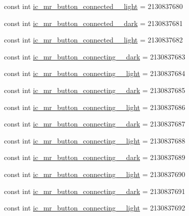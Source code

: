 \begin{CompactItemize}
\item 
const int \hyperlink{class__2doo_1_1_droid_1_1_resource_1_1_drawable_794fc7f06f62074237d996742779e538}{ic\_\-mr\_\-button\_\-connected\_\_\-light} = 2130837680
\item 
const int \hyperlink{class__2doo_1_1_droid_1_1_resource_1_1_drawable_19941e3666c8f84a0aa673fccf871468}{ic\_\-mr\_\-button\_\-connected\_\_\-dark} = 2130837681
\item 
const int \hyperlink{class__2doo_1_1_droid_1_1_resource_1_1_drawable_a088eb060697190f1fe0432b09ccea9f}{ic\_\-mr\_\-button\_\-connected\_\_\-light} = 2130837682
\item 
const int \hyperlink{class__2doo_1_1_droid_1_1_resource_1_1_drawable_872f7ccbfaf38cc5b67f7b20009fd29b}{ic\_\-mr\_\-button\_\-connecting\_\_\-dark} = 2130837683
\item 
const int \hyperlink{class__2doo_1_1_droid_1_1_resource_1_1_drawable_2c5d9049e66ff540fd91e6d675e60fb3}{ic\_\-mr\_\-button\_\-connecting\_\_\-light} = 2130837684
\item 
const int \hyperlink{class__2doo_1_1_droid_1_1_resource_1_1_drawable_e99663a67bfc151d49cc2e3a6290e0a3}{ic\_\-mr\_\-button\_\-connecting\_\_\-dark} = 2130837685
\item 
const int \hyperlink{class__2doo_1_1_droid_1_1_resource_1_1_drawable_2856dcc480a33475adeafd3711bccb3d}{ic\_\-mr\_\-button\_\-connecting\_\_\-light} = 2130837686
\item 
const int \hyperlink{class__2doo_1_1_droid_1_1_resource_1_1_drawable_82913032c4c18b69eb0ebcb71110fd2b}{ic\_\-mr\_\-button\_\-connecting\_\_\-dark} = 2130837687
\item 
const int \hyperlink{class__2doo_1_1_droid_1_1_resource_1_1_drawable_70850b5f147228431d1645d02aa24b9c}{ic\_\-mr\_\-button\_\-connecting\_\_\-light} = 2130837688
\item 
const int \hyperlink{class__2doo_1_1_droid_1_1_resource_1_1_drawable_5e5e4836c3183011b59368105789a298}{ic\_\-mr\_\-button\_\-connecting\_\_\-dark} = 2130837689
\item 
const int \hyperlink{class__2doo_1_1_droid_1_1_resource_1_1_drawable_f731e41561a5d9c67ffacdbd09daf53b}{ic\_\-mr\_\-button\_\-connecting\_\_\-light} = 2130837690
\item 
const int \hyperlink{class__2doo_1_1_droid_1_1_resource_1_1_drawable_c6022c2437b6fc925d3fa85060f22d72}{ic\_\-mr\_\-button\_\-connecting\_\_\-dark} = 2130837691
\item 
const int \hyperlink{class__2doo_1_1_droid_1_1_resource_1_1_drawable_96e2eca626d63bba216fc8c1f5d89dc0}{ic\_\-mr\_\-button\_\-connecting\_\_\-light} = 2130837692

\end{CompactItemize}
